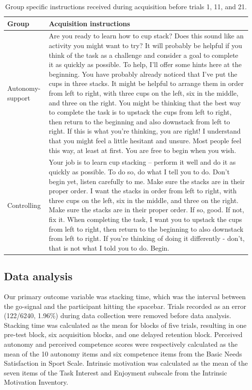 \documentclass[doc,floatsintext,donotrepeattitle,letterpaper,12pt]{apa7}
\begin{document}
\begin{table}[htb]
    \caption{Group speciﬁc instructions received during acquisition before trials 1, 11, and 21.}
    \label{tab:table2}
    \small
    \begin{tabular}{@{}p{1.3in}p{4.5in}@{}}
    \toprule
    Group            & Acquisition instructions \\
    \midrule
    Autonomy-support & Are you ready to learn how to cup stack? Does this sound like an activity you might want to try? It will probably be helpful if you think of the task as a challenge and consider a goal to complete it as quickly as possible. To help, I'll offer some hints here at the beginning. You have probably already noticed that I've put the cups in three stacks. It might be helpful to arrange them in order from left to right, with three cups on the left, six in the middle, and three on the right. You might be thinking that the best way to complete the task is to upstack the cups from left to right, then return to the beginning and also downstack from left to right. If this is what you're thinking, you are right! I understand that you might feel a little hesitant and unsure. Most people feel this way, at least at first. You are free to begin when you wish. \\
    \addlinespace[0.5em]
    Controlling      & Your job is to learn cup stacking -- perform it well and do it as quickly as possible. To do so, do what I tell you to do. Don't begin yet, listen carefully to me. Make sure the stacks are in their proper order. I want the stacks in order from left to right, with three cups on the left, six in the middle, and three on the right. Make sure the stacks are in their proper order. If so, good. If not, fix it. When completing the task, I want you to upstack the cups from left to right, then return to the beginning to also downstack from left to right. If you're thinking of doing it differently - don't, that is not what I told you to do. Begin. \\
    \bottomrule
    \end{tabular}
\end{table}

\subsection{Data analysis}

Our primary outcome variable was stacking time, which was the interval between the go-signal and the participant hitting the spacebar. Trials recorded as an error (122/6240, 1.96\%) during data collection were removed before data analysis. Stacking time was calculated as the mean for blocks of five trials, resulting in one pre-test block, six acquisition blocks, and one delayed retention block. Perceived autonomy and perceived competence scores were respectively calculated as the mean of the 10 autonomy items and six competence items from the Basic Needs Satisfaction in Sport Scale. Intrinsic motivation was calculated as the mean of the seven items of the Task Interest and Enjoyment subscale from the Intrinsic Motivation Inventory.
\end{document}
